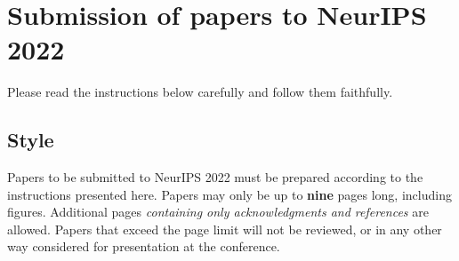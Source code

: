 \documentclass{article}
\begin{document}

\section{Submission of papers to NeurIPS 2022}


Please read the instructions below carefully and follow them faithfully.


\subsection{Style}


Papers to be submitted to NeurIPS 2022 must be prepared according to the
instructions presented here. Papers may only be up to {\bf nine} pages long,
including figures. Additional pages \emph{containing only acknowledgments and
references} are allowed. Papers that exceed the page limit will not be
reviewed, or in any other way considered for presentation at the conference.
\end{document}
